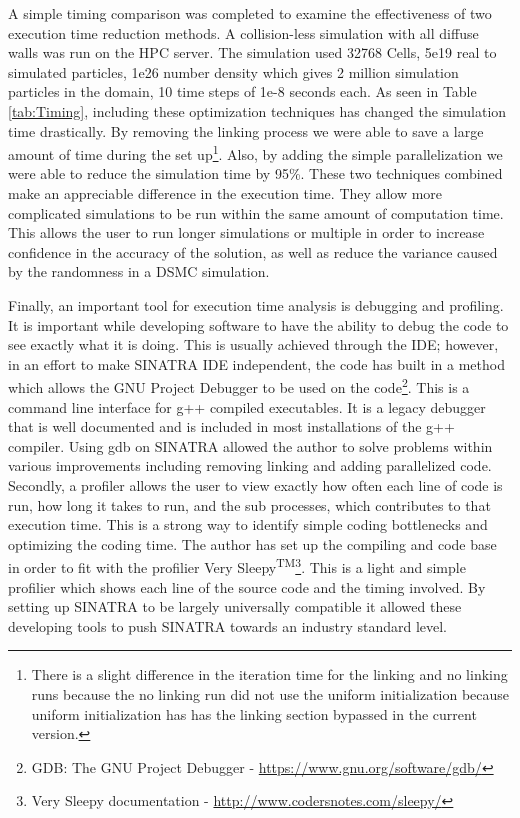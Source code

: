 \indent A simple timing comparison was completed to examine the effectiveness of two execution time reduction methods. A collision-less simulation with all diffuse walls was run on the HPC server. The simulation used 32768 Cells, 5e19 real to simulated particles, 1e26 number density which gives 2 million simulation particles in the domain, 10 time steps of 1e-8 seconds each. As seen in Table \ref{tab:Timing}, including these optimization techniques has changed the simulation time drastically. By removing the linking process we were able to save a large amount of time during the set up\footnote{There is a slight difference in the iteration time for the linking and no linking runs because the no linking run did not use the uniform initialization because uniform initialization has has the linking section bypassed in the current version.}. Also, by adding the simple parallelization we were able to reduce the simulation time by 95\%. These two techniques combined make an appreciable difference in the execution time. They allow more complicated simulations to be run within the same amount of computation time. This allows the user to run longer simulations or multiple in order to increase confidence in the accuracy of the solution, as well as reduce the variance caused by the randomness in a DSMC simulation. \par

\indent Finally, an important tool for execution time analysis is debugging and profiling. It is important while developing software to have the ability to debug the code to see exactly what it is doing. This is usually achieved through the IDE; however, in an effort to make SINATRA IDE independent, the code has built in a method which allows the GNU Project Debugger to be used on the code\footnote{GDB: The GNU Project Debugger - \url{https://www.gnu.org/software/gdb/}}. This is a command line interface for g++ compiled executables. It is a legacy debugger that is well documented and is included in most installations of the g++ compiler. Using gdb on SINATRA allowed the author to solve problems within various improvements including removing linking and adding parallelized code. Secondly, a profiler allows the user to view exactly how often each line of code is run, how long it takes to run, and the sub processes, which contributes to that execution time. This is a strong way to identify simple coding bottlenecks and optimizing the coding time. The author has set up the compiling and code base in order to fit with the profilier Very Sleepy\textsuperscript{TM}\footnote{Very Sleepy documentation - \url{http://www.codersnotes.com/sleepy/}}. This is a light and simple profilier which shows each line of the source code and the timing involved. By setting up SINATRA to be largely universally compatible it allowed these developing tools to push SINATRA towards an industry standard level. \par



